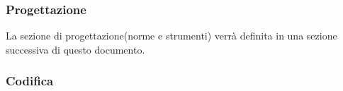 	\subsubsection{Progettazione}
		La sezione di progettazione(norme e strumenti) verrà definita in una sezione successiva di questo documento.
	\subsubsection{Codifica} \label{sec:cod}
				

